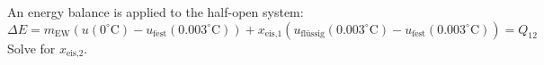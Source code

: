 An energy balance is applied to the half-open system:  
\[
\Delta E = m_{\text{EW}} \left( u(0^\circ\text{C}) - u_{\text{fest}}(0.003^\circ\text{C}) \right) + x_{\text{eis,1}} \left( u_{\text{flüssig}}(0.003^\circ\text{C}) - u_{\text{fest}}(0.003^\circ\text{C}) \right) = Q_{12}
\]  
Solve for \( x_{\text{eis,2}} \).